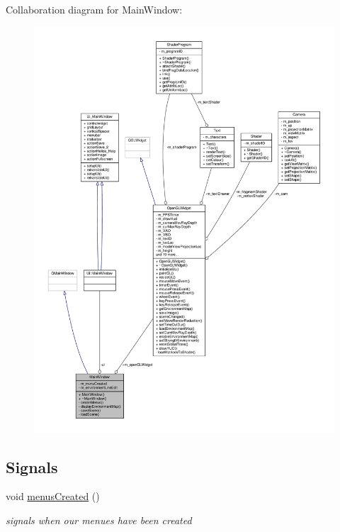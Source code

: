 Collaboration diagram for Main\-Window\-:
\nopagebreak
\begin{figure}[H]
\begin{center}
\leavevmode
\includegraphics[width=350pt]{class_main_window__coll__graph}
\end{center}
\end{figure}
\subsection*{Signals}
\begin{DoxyCompactItemize}
\item 
\hypertarget{class_main_window_a236b3b5276d6982049ce4a8c32664611}{void \hyperlink{class_main_window_a236b3b5276d6982049ce4a8c32664611}{menus\-Created} ()}\label{class_main_window_a236b3b5276d6982049ce4a8c32664611}

\begin{DoxyCompactList}\small\item\em signals when our menues have been created \end{DoxyCompactList}\end{DoxyCompactItemize}
